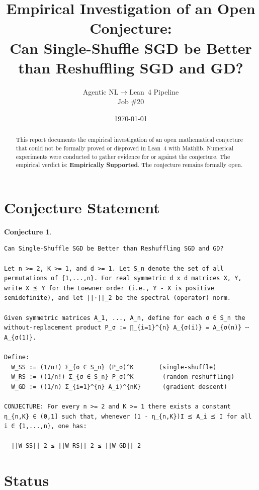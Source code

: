 \documentclass[11pt]{article}
\title{Empirical Investigation of an Open Conjecture:\\
Can Single-Shuffle SGD be Better than Reshuffling SGD and GD?}
\author{Agentic NL$\to$Lean~4 Pipeline \\ \small Job \#20}
\date{\today}
\newtheorem{conjecture}{Conjecture}
\begin{document}
\maketitle

\begin{abstract}
This report documents the empirical investigation of an open mathematical conjecture
that could not be formally proved or disproved in Lean~4 with Mathlib.
Numerical experiments were conducted to gather evidence for or against the conjecture.
The empirical verdict is: \textbf{\textcolor{green!70!black}{Empirically Supported}}.
The conjecture remains formally open.
\end{abstract}

\section{Conjecture Statement}

\begin{conjecture}
\begin{lstlisting}
Can Single-Shuffle SGD be Better than Reshuffling SGD and GD?

Let n >= 2, K >= 1, and d >= 1. Let S_n denote the set of all permutations of {1,...,n}. For real symmetric d x d matrices X, Y, write X ⪯ Y for the Loewner order (i.e., Y - X is positive semidefinite), and let ||·||_2 be the spectral (operator) norm.

Given symmetric matrices A_1, ..., A_n, define for each σ ∈ S_n the without-replacement product P_σ := ∏_{i=1}^{n} A_{σ(i)} = A_{σ(n)} ⋯ A_{σ(1)}.

Define:
  W_SS := (1/n!) Σ_{σ ∈ S_n} (P_σ)^K       (single-shuffle)
  W_RS := ((1/n!) Σ_{σ ∈ S_n} P_σ)^K        (random reshuffling)
  W_GD := ((1/n) Σ_{i=1}^{n} A_i)^{nK}      (gradient descent)

CONJECTURE: For every n >= 2 and K >= 1 there exists a constant η_{n,K} ∈ (0,1] such that, whenever (1 - η_{n,K})I ⪯ A_i ⪯ I for all i ∈ {1,...,n}, one has:

  ||W_SS||_2 ≤ ||W_RS||_2 ≤ ||W_GD||_2
\end{lstlisting}
\end{conjecture}

\section{Status}

\begin{center}
\end{center}
\end{document}
